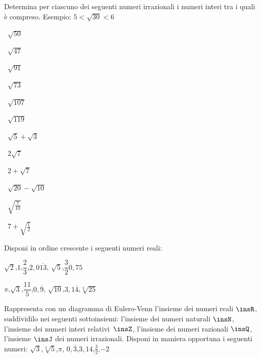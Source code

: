 \begin{esercizio}
\label{ese:1.4}
 Determina per ciascuno dei seguenti numeri irrazionali i numeri interi tra i 
quali è compreso. Esempio: $5<\sqrt{30}<6$
\begin{multicols}{4}
\begin{enumeratea}
 \item~$\sqrt{50}$
 \item~$\sqrt{47}$
 \item~$\sqrt{91}$
 \item~$\sqrt{73}$
 \item~$\sqrt{107}$
 \item~$\sqrt{119}$
 \item~$\sqrt 5+\sqrt 3$
 \item~$2\sqrt 7$
 \item~$2+\sqrt 7$
 \item~$\sqrt{20}-\sqrt{10}$
 \item~$\sqrt{\frac 7{10}}$
 \item~$7+\sqrt{\frac 1 2}$
\end{enumeratea}
\end{multicols}
\end{esercizio}

\begin{esercizio}
\label{ese:1.5}
 Disponi in ordine crescente i seguenti numeri reali:
\begin{multicols}{2}
 \begin{enumeratea}
 \item $\sqrt 2$,\quad $1$,\quad $\dfrac 2 3$,\quad $2,0\overline{13}$,\quad 
$\sqrt 5$,\quad $\dfrac 3 2$\quad $0,75$
 \item $\pi$,\quad $\sqrt 3$,\quad $\dfrac{11} 5$,\quad $0,\overline 9$,\quad 
$\sqrt{10}$,\quad $3,1\overline 4$,\quad $\sqrt[3]{25}$
 \end{enumeratea}
\end{multicols}
\end{esercizio}

\begin{esercizio}
\label{ese:1.6}
 Rappresenta con un diagramma di Eulero-Venn l'insieme dei numeri reali 
$\insR$, suddividilo nei seguenti sottoinsiemi: l'insieme dei numeri naturali 
$\insN$, l'insieme dei numeri interi relativi~$\insZ$, l'insieme dei numeri 
razionali $\insQ$, l'insieme $\insJ$ dei numeri irrazionali. Disponi in maniera 
opportuna i seguenti numeri: $\sqrt 3$,\quad $\sqrt[3]5$,\quad$\pi$,\quad 
$0,\overline 3$,\quad $3,14$,\quad $\frac 3 2$,\quad$-2$
\end{esercizio}

